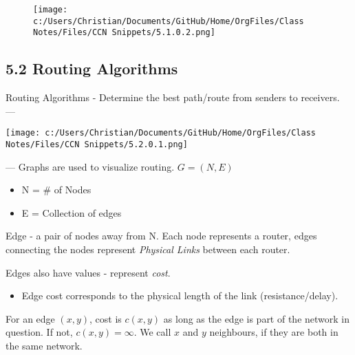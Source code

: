 \documentclass[11pt]{article}
\begin{document}
\begin{figure}[htbp]
\centering
\texttt{[image: c:/Users/Christian/Documents/GitHub/Home/OrgFiles/Class Notes/Files/CCN Snippets/5.1.0.2.png]}
\end{figure}

\subsection{5.2 Routing Algorithms}
\label{sec:org00763fc}

Routing Algorithms - Determine the best path/route from senders to receivers.
---
\begin{center}
\texttt{[image: c:/Users/Christian/Documents/GitHub/Home/OrgFiles/Class Notes/Files/CCN Snippets/5.2.0.1.png]}
\end{center}

---
Graphs are used to visualize routing.
\(G = (N,E)\)
\begin{itemize}
\item N = \# of Nodes
\item E = Collection of edges
\end{itemize}

Edge - a pair of nodes away from N.
Each node represents a router, edges connecting the nodes represent \emph{Physical Links} between each router.

Edges also have values - represent \emph{cost}.
\begin{itemize}
\item Edge cost corresponds to the physical length of the link (resistance/delay).
\end{itemize}
For an edge \((x,y)\), cost is \(c(x,y)\) as long as the edge is part of the network in question. If not, \(c(x,y)=\infty\).
We call \(x\) and \(y\) neighbours, if they are both in the same network.
\end{document}
